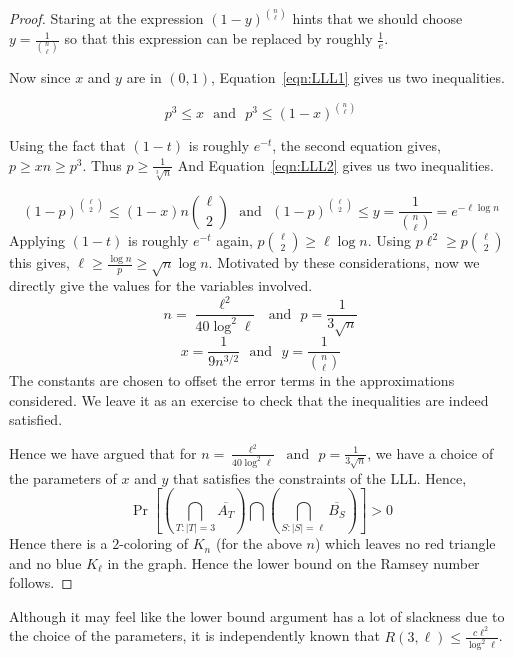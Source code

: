 \begin{proof}
Staring at the expression $(1-y)^{n \choose \ell}$ hints that we should choose $y=\frac{1}{{n \choose \ell}}$ so that this expression can be replaced by roughly $\frac{1}{e}$.

Now since $x$ and $y$ are in $(0,1)$, Equation~\ref{eqn:LLL1} gives us two inequalities.

$$p^3 \le x \textrm{~~and~~} p^3 \le (1-x)^{n \choose \ell}$$

Using the fact that $(1-t)$ is roughly $e^{-t}$, the second equation gives, $p \ge xn \ge p^3$. Thus $p \ge \frac{1}{\sqrt[3]{n}}$
And Equation~\ref{eqn:LLL2} gives us two inequalities.

$$(1-p)^{\ell \choose 2} \le (1-x){n{\ell \choose 2}}
\textrm{~~and~~}(1-p)^{\ell \choose 2} \le y = \frac{1}{{n \choose \ell}} = e^{-\ell\log n}
$$
Applying $(1-t)$ is roughly $e^{-t}$ again, $p{\ell \choose 2} \ge \ell \log n$. Using $p \ell^2 \ge p{\ell \choose 2}$ this gives, $\ell \ge \frac{\log n}{p} \ge \sqrt{n} \log n$. Motivated by these considerations, now we directly give the values for the variables involved.
$$n = \frac{\ell^2}{40\log^2 \ell} \textrm{~~and~~} p = \frac{1}{3\sqrt{n}}$$
$$x = \frac{1}{9n^{3/2}}\textrm{~~and~~}
y =  \frac{1}{{n \choose \ell}}$$
The constants are chosen to offset the error terms in the approximations considered. We leave it as an exercise to check that the inequalities are indeed satisfied.

Hence we have argued that for $n=\frac{\ell^2}{40\log^2 \ell} \textrm{~~and~~} p = \frac{1}{3\sqrt{n}}$, we have a choice of the parameters of $x$ and $y$ that satisfies the constraints of the LLL. Hence, 
$$\Pr\left[\left(\bigcap_{T:|T|=3} \overline{A_T} \right) \bigcap \left(\bigcap_{S:|S|=\ell} \overline{B_S}\right)\right] > 0$$
Hence there is a $2$-coloring of $K_n$ (for the above $n$) which leaves no red triangle and no blue $K_\ell$ in the graph. Hence the lower bound on the Ramsey number follows.
\end{proof}

\begin{remark}
Although it may feel like the lower bound argument has a lot of slackness due to the choice of the parameters, it is independently known that 
$R(3,\ell) \le \frac{c\ell^2}{\log^2 \ell}$.
\end{remark}


